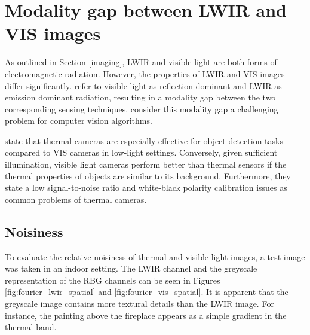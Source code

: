 \documentclass{l4proj}
\begin{document}

\section{Modality gap between LWIR and VIS images}
\label{modality}

As outlined in Section \ref{imaging}, LWIR and visible light are both forms of electromagnetic radiation. However, the properties of LWIR and VIS images differ significantly. \citet{sarfraz_deep_2017} refer to visible light as reflection dominant and LWIR as emission dominant radiation, resulting in a modality gap between the two corresponding sensing techniques. \citet{choi_thermal_2012} consider this modality gap a challenging problem for computer vision algorithms.

\citet{davis_background-subtraction_2007} state that thermal cameras are especially effective for object detection tasks compared to VIS cameras in low-light settings. Conversely, given sufficient illumination, visible light cameras perform better than thermal sensors if the thermal properties of objects are similar to its background. Furthermore, they state a low signal-to-noise ratio and white-black polarity calibration issues as common problems of thermal cameras.

\subsection{Noisiness}

To evaluate the relative noisiness of thermal and visible light images, a test image was taken in an indoor setting. The LWIR channel and the greyscale representation of the RBG channels can be seen in Figures \ref{fig:fourier_lwir_spatial} and \ref{fig:fourier_vis_spatial}. It is apparent that the greyscale image contains more textural details than the LWIR image. For instance, the painting above the fireplace appears as a simple gradient in the thermal band.
\end{document}
